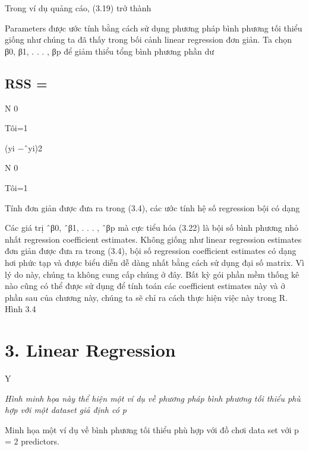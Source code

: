 Trong ví dụ quảng cáo, (3.19) trở thành

Parameters được ước tính bằng cách sử dụng phương pháp bình phương tối thiểu giống như chúng ta đã thấy trong bối cảnh linear regression đơn giản. Ta chọn β0, β1, . . . , βp để giảm thiểu tổng bình phương phần dư

\subsection{RSS =}

N 0

Tôi=1

(yi −ˆyi)2

N 0

Tôi=1

Tính đơn giản được đưa ra trong (3.4), các ước tính hệ số regression bội có dạng

Các giá trị ˆβ0, ˆβ1, . . . , ˆβp mà cực tiểu hóa (3.22) là bội số bình phương nhỏ nhất regression coefficient estimates. Không giống như linear regression estimates đơn giản được đưa ra trong (3.4), bội số regression coefficient estimates có dạng hơi phức tạp và được biểu diễn dễ dàng nhất bằng cách sử dụng đại số matrix. Vì lý do này, chúng ta không cung cấp chúng ở đây. Bất kỳ gói phần mềm thống kê nào cũng có thể được sử dụng để tính toán các coefficient estimates này và ở phần sau của chương này, chúng ta sẽ chỉ ra cách thực hiện việc này trong R. Hình 3.4

\section{3. Linear Regression}

Y

\noindent\textit{Hình minh họa này thể hiện một ví dụ về phương pháp bình phương tối thiểu phù hợp với một dataset giả định có p}

Minh họa một ví dụ về bình phương tối thiểu phù hợp với đồ chơi data set với p = 2 predictors.

